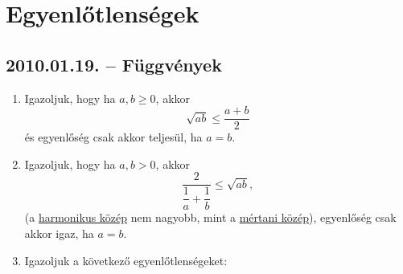 \section{Egyenlőtlenségek}

\subsection*{2010.01.19. -- Függvények}
\begin{enumerate}
\item Igazoljuk, hogy ha $a,b \ge 0$, akkor  $$\sqrt{ab}\le \dfrac{a+b}{2}$$
és egyenlőség csak akkor teljesül, ha $a=b$.
\item Igazoljuk, hogy ha $a,b > 0$, akkor  $$\frac{2}{\dfrac{1}{a}+\dfrac{1}{b}}\le \sqrt{ab},$$
(a \underline{harmonikus közép} nem nagyobb, mint a \underline{mértani közép}),
egyenlőség csak akkor igaz, ha $a=b$.
\item Igazoljuk a következő egyenlőtlenségeket:
\end{enumerate}

